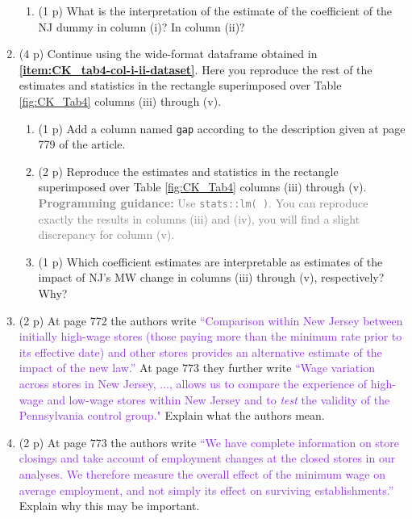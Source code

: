 \documentclass{article}
\begin{document}
\begin{enumerate}[label=\textbf{Q\arabic{enumi}}.,ref=Q\arabic{enumi}, wide=0pt, itemsep=0em, topsep=5pt, labelindent=0pt, resume]
\begin{enumerate}
\item (1 p) What is the interpretation of the estimate of the coefficient of the NJ dummy in column (i)? In column (ii)?
\end{enumerate}
\item (4 p) Continue using the wide-format dataframe obtained in \textbf{\ref{item:CK_tab4-col-i-ii-dataset}}. Here you reproduce the rest of the estimates and statistics in the rectangle superimposed over Table \ref{fig:CK_Tab4} columns (iii) through (v). 
\begin{enumerate}
\item (1 p) Add a column named \texttt{gap} according to the description given at page 779 of the article. 
\item (2 p) Reproduce the estimates and statistics in the rectangle superimposed over Table \ref{fig:CK_Tab4} columns (iii) through (v). \textcolor{gray}{\textbf{Programming guidance:} Use \texttt{stats::lm( )}. You can reproduce exactly the results in columns (iii) and (iv), you will find a slight discrepancy for column (v).}
\item (1 p) Which coefficient estimates are interpretable as estimates of the impact of NJ's MW change in columns (iii) through (v), respectively? Why?
\end{enumerate}
\item (2 p) At page 772 the authors write \textcolor{BlueViolet}{``Comparison within New Jersey between initially high-wage stores (those paying more than the minimum rate prior to its effective date) and other stores provides an alternative estimate of the impact of the new law.''} At page 773 they further write \textcolor{BlueViolet}{``Wage variation across stores in New Jersey, ..., allows us to compare the experience of high-wage and low-wage stores within New Jersey and to \textit{test} the validity of the Pennsylvania control group."} Explain what the authors mean.
\item (2 p) At page 773 the authors write \textcolor{BlueViolet}{``We have complete information on store closings and take account of employment changes at the closed stores in our analyses. We therefore measure the overall effect of the minimum wage on average employment, and not simply its effect on surviving establishments.''} Explain why this may be important.
\end{enumerate}

\newpage
\end{document}
